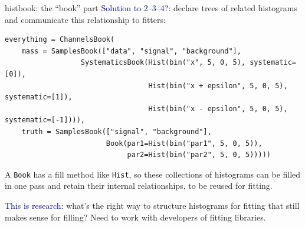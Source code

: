 \documentclass[aspectratio=169]{beamer}
\begin{document}
\begin{frame}[fragile]{histbook: the ``book'' part}
\vspace{0.25 cm}
\textcolor{darkblue}{Solution to 2--3--4?:} declare trees of related histograms and communicate this relationship to fitters:

\scriptsize
\begin{verbatim}
everything = ChannelsBook(
    mass = SamplesBook(["data", "signal", "background"],
                  SystematicsBook(Hist(bin("x", 5, 0, 5), systematic=[0]),
                                  Hist(bin("x + epsilon", 5, 0, 5), systematic=[1]),
                                  Hist(bin("x - epsilon", 5, 0, 5), systematic=[-1]))),
    truth = SamplesBook(["signal", "background"],
                        Book(par1=Hist(bin("par1", 5, 0, 5)),
                             par2=Hist(bin("par2", 5, 0, 5)))))
\end{verbatim}

\normalsize
\vspace{0.5 cm}
A {\tt\small Book} has a fill method like {\tt\small Hist}, so these collections of histograms can be filled in one pass and retain their internal relationships, to be reused for fitting.

\vspace{0.5 cm}
\textcolor{darkblue}{This is research:} what's the right way to structure histograms for fitting that still makes sense for filling? Need to work with developers of fitting libraries.
\end{frame}
\end{document}
